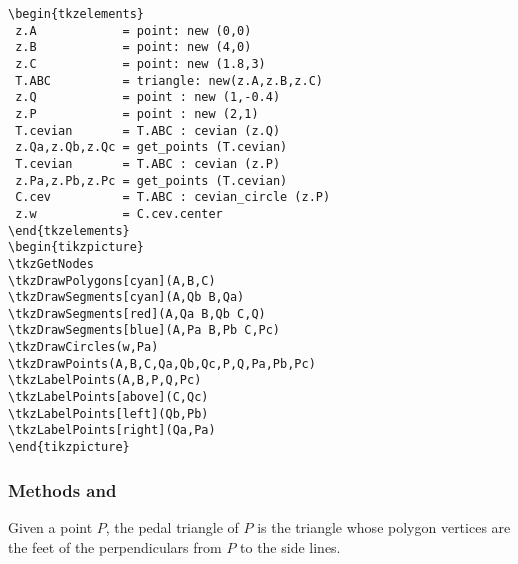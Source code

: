 \begin{minipage}{.5\textwidth}
\begin{Verbatim}
\begin{tkzelements}
 z.A            = point: new (0,0)
 z.B            = point: new (4,0)
 z.C            = point: new (1.8,3)
 T.ABC          = triangle: new(z.A,z.B,z.C)
 z.Q            = point : new (1,-0.4) 
 z.P            = point : new (2,1) 
 T.cevian       = T.ABC : cevian (z.Q)
 z.Qa,z.Qb,z.Qc = get_points (T.cevian)
 T.cevian       = T.ABC : cevian (z.P)
 z.Pa,z.Pb,z.Pc = get_points (T.cevian)
 C.cev          = T.ABC : cevian_circle (z.P)
 z.w            = C.cev.center
\end{tkzelements}
\begin{tikzpicture}
\tkzGetNodes
\tkzDrawPolygons[cyan](A,B,C)
\tkzDrawSegments[cyan](A,Qb B,Qa)
\tkzDrawSegments[red](A,Qa B,Qb C,Q)
\tkzDrawSegments[blue](A,Pa B,Pb C,Pc)
\tkzDrawCircles(w,Pa)
\tkzDrawPoints(A,B,C,Qa,Qb,Qc,P,Q,Pa,Pb,Pc)
\tkzLabelPoints(A,B,P,Q,Pc)
\tkzLabelPoints[above](C,Qc)
\tkzLabelPoints[left](Qb,Pb)
\tkzLabelPoints[right](Qa,Pa)
\end{tikzpicture}
\end{Verbatim}
\end{minipage}



\subsubsection{Methods  and } %
\label{ssub:method_imeth_triangle_pedal}

Given a point $P$, the pedal triangle of $P$ is the triangle whose polygon vertices are the feet of the perpendiculars from $P$ to the side lines. 

